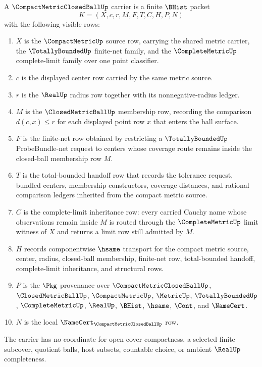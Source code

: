 \begin{definition}
\label{def:compact-metric-closed-ball-carrier}
A $\CompactMetricClosedBallUp$ carrier is a finite $\BHist$ packet
$$
K=(X,c,r,M,F,T,C,H,P,N)
$$
with the following visible rows:
\begin{enumerate}
\item $X$ is the $\CompactMetricUp$ source row, carrying the shared metric carrier, the $\TotallyBoundedUp$ finite-net family, and the $\CompleteMetricUp$ complete-limit family over one point classifier.
\item $c$ is the displayed center row carried by the same metric source.
\item $r$ is the $\RealUp$ radius row together with its nonnegative-radius ledger.
\item $M$ is the $\ClosedMetricBallUp$ membership row, recording the comparison $d(c,x)\leq r$ for each displayed point row $x$ that enters the ball surface.
\item $F$ is the finite-net row obtained by restricting a $\TotallyBoundedUp$ ProbeBundle-net request to centers whose coverage route remains inside the closed-ball membership row $M$.
\item $T$ is the total-bounded handoff row that records the tolerance request, bundled centers, membership constructors, coverage distances, and rational comparison ledgers inherited from the compact metric source.
\item $C$ is the complete-limit inheritance row: every carried Cauchy name whose observations remain inside $M$ is routed through the $\CompleteMetricUp$ limit witness of $X$ and returns a limit row still admitted by $M$.
\item $H$ records componentwise $\hsame$ transport for the compact metric source, center, radius, closed-ball membership, finite-net row, total-bounded handoff, complete-limit inheritance, and structural rows.
\item $P$ is the $\Pkg$ provenance over $\CompactMetricClosedBallUp$, $\ClosedMetricBallUp$, $\CompactMetricUp$, $\MetricUp$, $\TotallyBoundedUp$, $\CompleteMetricUp$, $\RealUp$, $\BHist$, $\hsame$, $\Cont$, and $\NameCert$.
\item $N$ is the local $\NameCert_{\CompactMetricClosedBallUp}$ row.
\end{enumerate}
The carrier has no coordinate for open-cover compactness, a selected finite subcover, quotient balls, host subsets, countable choice, or ambient $\RealUp$ completeness.
\end{definition}

